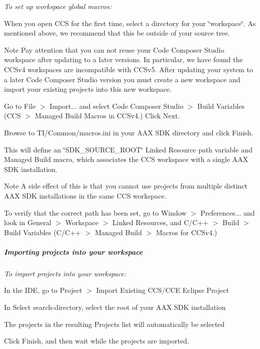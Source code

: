  {\itshape  To set up workspace global macros\+: } 
\begin{DoxyEnumerate}
\item When you open C\+C\+S for the first time, select a directory for your \char`\"{}workspace\char`\"{}. As mentioned above, we recommend that this be outside of your source tree.  \begin{DoxyNote}{Note}
Pay attention that you can not reuse your Code Composer Studio workspace after updating to a later versions. In particular, we have found the C\+C\+Sv4 workspaces are incompatible with C\+C\+Sv5. After updating your system to a later Code Composer Studio version you must create a new workspace and import your existing projects into this new workspace. 
\end{DoxyNote}

\item Go to File $>$ Import... and select Code Composer Studio $>$ Build Variables (C\+C\+S $>$ Managed Build Macros in C\+C\+Sv4.) Click Next.  
\item Browse to T\+I/\+Common/macros.\+ini in your A\+A\+X S\+D\+K directory and click Finish.  
\item This will define an \char`\"{}\+S\+D\+K\+\_\+\+S\+O\+U\+R\+C\+E\+\_\+\+R\+O\+O\+T\char`\"{} Linked Resource path variable and Managed Build macro, which associates the C\+C\+S workspace with a single A\+A\+X S\+D\+K installation. \begin{DoxyNote}{Note}
A side effect of this is that you cannot use projects from multiple distinct A\+A\+X S\+D\+K installations in the same C\+C\+S workspace.  
\end{DoxyNote}

\item To verify that the correct path has been set, go to Window $>$ Preferences... and look in General $>$ Workspace $>$ Linked Resources, and C/\+C++ $>$ Build $>$ Build Variables (C/\+C++ $>$ Managed Build $>$ Macros for C\+C\+Sv4.) 
\end{DoxyEnumerate}\subparagraph*{Importing projects into your workspace }

 {\itshape  To import projects into your workspace\+:} 
\begin{DoxyEnumerate}
\item In the I\+D\+E, go to Project $>$ Import Existing C\+C\+S/\+C\+C\+E Eclipse Project  
\item In Select search-\/directory, select the root of your A\+A\+X S\+D\+K installation  
\item The projects in the resulting Projects list will automatically be selected  
\item Click Finish, and then wait while the projects are imported.  
\end{DoxyEnumerate}


